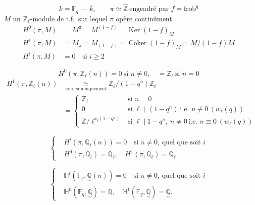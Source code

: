 \documentclass[11pt,a4paper]{article}
\begin{document}
\[
  k = \mathbb{F}_{q} \;\text{---}\; \bar{k}, \qquad \pi \simeq
  \hat{\mathbb{Z}} \ \text{engendré par } f = \mathrm{frob}^{q}
\]
$M$ un $\mathbb{Z}_{\ell}$-module de t.f.\ sur lequel $\pi$ opère
continûment.
\[
\begin{aligned}
  H^{0}(\pi, M) &= M^{\pi} = M^{(1-f)} = \operatorname{Ker}(1-f)_{M} \\
  H^{1}(\pi, M) &= M_{\pi} = M_{(1-f)} = \operatorname{Coker}(1-f)_{M} = M/(1-f)M \\
  H^{i}(\pi, M) &= 0 \quad \text{si } i \geq 2
\end{aligned}
\]

\[
  H^{0}(\pi, \mathbb{Z}_{\ell}(n)) = 0 \ \text{si } n \neq 0, \quad =
  \mathbb{Z}_{\ell} \ \text{si } n = 0
\]
\[
\begin{aligned}
  H^{1}(\pi, \mathbb{Z}_{\ell}(n)) &\underset{\text{non canoniquement}}{\simeq}
  \mathbb{Z}_{\ell}/(1-q^{n})\mathbb{Z}_{\ell} \\
  &= \begin{cases}
    \mathbb{Z}_{\ell} & \text{si } n = 0 \\
    0 & \text{si } \ell \nmid (1-q^{n}) \ \text{i.e. } n \not\equiv 0 \ (w_{\ell}(q)) \\
    \mathbb{Z}/\ell^{v_{\ell}(1-q^{n})} & \text{si } \ell \mid 1-q^{n},\ n \neq 0 \ \text{i.e. } n \equiv 0 \ (w_{\ell}(q))
  \end{cases}
\end{aligned}
\]


\[
\left\{
\begin{aligned}
  & H^{i}(\pi, \mathbb{Q}_{\ell}(n)) = 0 \quad \text{si } n \neq 0, \ \text{quel que soit } i \\
  & H^{0}(\pi, \mathbb{Q}_{\ell}) = \mathbb{Q}_{\ell}, \quad H^{1}(\pi, \mathbb{Q}_{\ell}) = \mathbb{Q}_{\ell}
\end{aligned}
\right.
\]


\[
\left\{
\begin{aligned}
  & \mathbb{H}^{i}(\mathbb{F}_{q}, \underset{\sim}{\mathbb{Q}}(n)) = 0 \quad \text{si } n \neq 0, \ \text{quel que soit } i \\
  & \mathbb{H}^{0}(\mathbb{F}_{q}, \underset{\sim}{\mathbb{Q}}) = \mathbb{Q}, \quad \mathbb{H}^{1}(\mathbb{F}_{q}, \underset{\sim}{\mathbb{Q}}) = \underset{\sim}{\mathbb{Q}}.
\end{aligned}
\right.
\]
\end{document}
